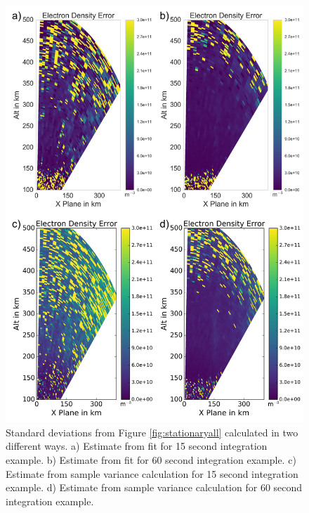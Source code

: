 \documentclass[draft,ras]{agutex}
\begin{document}
\begin{article}
\begin{figure}[!t]
\centering
\includegraphics[width=5in]{Errorstationary}
\caption{Standard deviations from Figure \ref{fig:stationaryall} calculated in two different ways. a)  Estimate from fit for 15 second integration example. b) Estimate from fit for 60 second integration example. c) Estimate from sample variance calculation for 15 second integration example. d) Estimate from sample variance calculation for 60 second integration example.}
\label{fig:errorstationaryall}
\end{figure}



\end{article}
\end{document}

